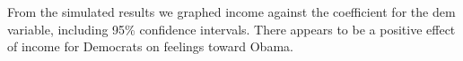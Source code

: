 \documentclass[12pt]{article}
\begin{document}
\begin{enumerate}
From the simulated results we graphed income against the coefficient for the dem variable, including 95\% confidence intervals.  There appears to be a positive effect of income for Democrats on feelings toward Obama.

\end{enumerate}
\end{document}
